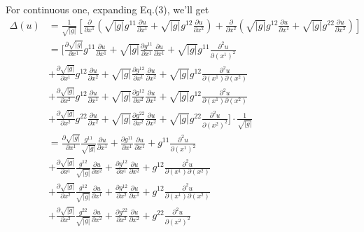 \documentclass{article}
\theoremstyle{definition}
\theoremstyle{plain}
\begin{document}
For continuous one, expanding Eq.(3), we'll get
\begin{align}
    \Delta(u)
    &=\frac{1}{\sqrt{|g|}}\left[\frac{\partial}{\partial x^1}\left(\sqrt{|g|}g^{11}\frac{\partial u}{\partial x^1}+\sqrt{|g|}g^{12}\frac{\partial u}{\partial x^2}\right)+\frac{\partial}{\partial x^2}\left(\sqrt{|g|}g^{12}\frac{\partial u}{\partial x^1}+\sqrt{|g|}g^{22}\frac{\partial u}{\partial x^2}\right)\right]\\ \nonumber
    &=[\frac{\partial \sqrt{|g|}}{\partial x^1}g^{11}\frac{\partial u}{\partial x^1}+\sqrt{|g|}\frac{\partial g^{11}}{\partial x^1}\frac{\partial u}{\partial x^1}+\sqrt{|g|}g^{11}\frac{\partial^2u}{\partial(x^1)^2}\\ \nonumber
    &+\frac{\partial \sqrt{|g|}}{\partial x^1}g^{12}\frac{\partial u}{\partial x^2}+\sqrt{|g|}\frac{\partial g^{12}}{\partial x^1}\frac{\partial u}{\partial x^2}+\sqrt{|g|}g^{12}\frac{\partial^2u}{\partial(x^1)\partial(x^2)}\\ \nonumber
    &+\frac{\partial \sqrt{|g|}}{\partial x^2}g^{12}\frac{\partial u}{\partial x^1}+\sqrt{|g|}\frac{\partial g^{12}}{\partial x^2}\frac{\partial u}{\partial x^1}+\sqrt{|g|}g^{12}\frac{\partial^2u}{\partial(x^1)\partial(x^2)}\\ \nonumber
    &+\frac{\partial \sqrt{|g|}}{\partial x^2}g^{22}\frac{\partial u}{\partial x^2}+\sqrt{|g|}\frac{\partial g^{22}}{\partial x^2}\frac{\partial u}{\partial x^2}+\sqrt{|g|}g^{22}\frac{\partial^2u}{\partial(x^2)^2}]\cdot\frac{1}{\sqrt{|g|}}\\ \nonumber
    &=\frac{\partial \sqrt{|g|}}{\partial x^1}\frac{g^{11}}{\sqrt{|g|}}\frac{\partial u}{\partial x^1}+\frac{\partial g^{11}}{\partial x^1}\frac{\partial u}{\partial x^1}+g^{11}\frac{\partial^2u}{\partial(x^1)^2}\\ \nonumber
    &+\frac{\partial \sqrt{|g|}}{\partial x^1}\frac{g^{12}}{\sqrt{|g|}}\frac{\partial u}{\partial x^2}+\frac{\partial g^{12}}{\partial x^1}\frac{\partial u}{\partial x^2}+g^{12}\frac{\partial^2u}{\partial(x^1)\partial(x^2)}\\ \nonumber
    &+\frac{\partial \sqrt{|g|}}{\partial x^2}\frac{g^{12}}{\sqrt{|g|}}\frac{\partial u}{\partial x^1}+\frac{\partial g^{12}}{\partial x^2}\frac{\partial u}{\partial x^1}+g^{12}\frac{\partial^2u}{\partial(x^1)\partial(x^2)}\\ \nonumber
    &+\frac{\partial \sqrt{|g|}}{\partial x^2}\frac{g^{22}}{\sqrt{|g|}}\frac{\partial u}{\partial x^2}+\frac{\partial g^{22}}{\partial x^2}\frac{\partial u}{\partial x^2}+g^{22}\frac{\partial^2u}{\partial(x^2)^2}\\ \nonumber

\end{align}
\end{document}
